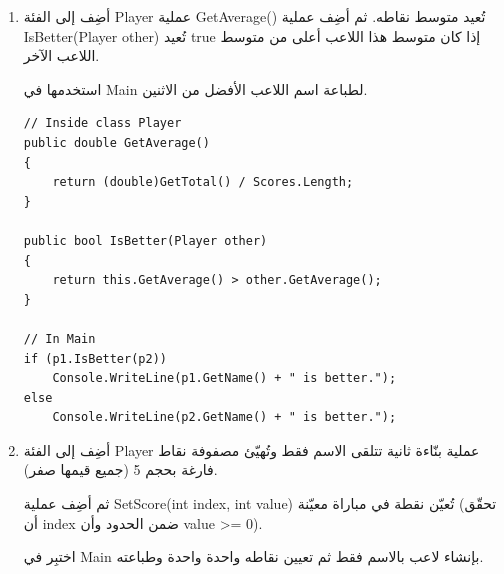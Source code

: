\documentclass[14pt]{extarticle}
\begin{document}
\begin{enumerate}
\ifwithsols
\begin{boxSolution}
\begin{english}
{\small
\begin{verbatim}
// Inside class Player
public int GetBest()
{
    int best = Scores[0];
    for (int i = 1; i < Scores.Length; i++)
        if (Scores[i] > best)
            best = Scores[i];
    return best;
}

// In Main
Console.WriteLine(p1.GetName() + " best: " + p1.GetBest());
Console.WriteLine(p2.GetName() + " best: " + p2.GetBest());
\end{verbatim}
}
\end{english}
\end{boxSolution}
\clearpage
\fi

\item
أضِف إلى الفئة \textenglish{Player} عملية \textenglish{GetAverage()} تُعيد متوسط نقاطه.
ثم أضِف عملية \textenglish{IsBetter(Player other)} تُعيد \textenglish{true} إذا كان
متوسط هذا اللاعب أعلى من متوسط اللاعب الآخر.

استخدمها في \textenglish{Main} لطباعة اسم اللاعب الأفضل من الاثنين.

\ifwithsols
\begin{boxSolution}
\begin{english}
{\small
\begin{verbatim}
// Inside class Player
public double GetAverage()
{
    return (double)GetTotal() / Scores.Length;
}

public bool IsBetter(Player other)
{
    return this.GetAverage() > other.GetAverage();
}

// In Main
if (p1.IsBetter(p2))
    Console.WriteLine(p1.GetName() + " is better.");
else
    Console.WriteLine(p2.GetName() + " is better.");
\end{verbatim}
}
\end{english}
\end{boxSolution}
\clearpage
\fi

\item
أضِف إلى الفئة \textenglish{Player} عملية بنّاءة ثانية تتلقى الاسم فقط
وتُهيّئ مصفوفة نقاط فارغة بحجم \textenglish{5} (جميع قيمها صفر).

ثم أضِف عملية \textenglish{SetScore(int index, int value)} تُعيّن نقطة
في مباراة معيّنة (تحقّق أن \textenglish{index} ضمن الحدود وأن \textenglish{value >= 0}).

اختبِر في \textenglish{Main} بإنشاء لاعب بالاسم فقط ثم تعيين نقاطه واحدة واحدة وطباعته.


\end{enumerate}
\end{document}
